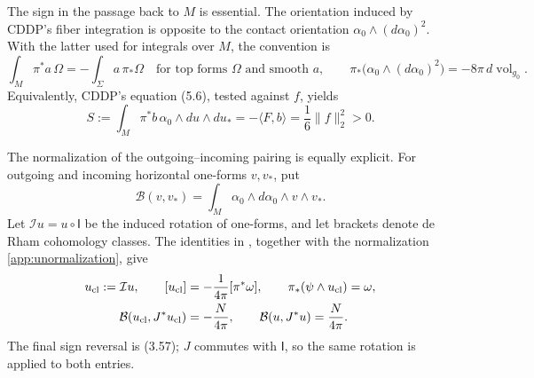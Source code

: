 \documentclass[11pt,letterpaper,reqno]{amsart}
\theoremstyle{remark}
\begin{document}
The sign in the passage back to $M$ is essential. The orientation
induced by CDDP's fiber integration is opposite to the contact
orientation $\alpha_0\wedge(d\alpha_0)^2$. With the latter used for
integrals over $M$, the convention is
\begin{equation}\label{app:orientation}
 \int_M\pi^*a\,\Omega
 =-\int_\Sigma a\,\pi_*\Omega
 \quad\text{for top forms $\Omega$ and smooth $a$},
 \qquad
 \pi_*\big(\alpha_0\wedge(d\alpha_0)^2\big)
 =-8\pi\,d\operatorname{vol}_{g_0}.
\end{equation}
Equivalently, CDDP's equation (5.6), tested against $f$, yields
\begin{equation}\label{app:Spositive}
 S:=\int_M\pi^*b\,\alpha_0\wedge du\wedge du_*
   =-\langle F,b\rangle
   =\frac16\|f\|_2^2>0.
\end{equation}

The normalization of the outgoing--incoming pairing is equally
explicit. For outgoing and incoming horizontal one-forms $v,v_*$, put
\begin{equation}\label{app:Bpairing}
 \mathcal B(v,v_*)
 =\int_M\alpha_0\wedge d\alpha_0\wedge v\wedge v_*.
\end{equation}
Let $\mathcal Iu=u\circ\mathsf I$ be the induced rotation of one-forms,
and let brackets denote de Rham cohomology classes. The identities in
\cite[Lemma~3.5, (3.57), (3.67), and the calculation preceding (3.59)]{CDDP},
together with the normalization
\eqref{app:unormalization}, give
\begin{align}\label{app:Bnormalization}
 u_{\rm cl}:=\mathcal Iu,\qquad
 [u_{\rm cl}]&=-\frac{1}{4\pi}[\pi^*\omega],\qquad
 \pi_*(\psi\wedge u_{\rm cl})=\omega,\notag\\
 \mathcal B(u_{\rm cl},J^*u_{\rm cl})&=-\frac{N}{4\pi},\qquad
 \mathcal B(u,J^*u)=\frac{N}{4\pi}.
\end{align}
The final sign reversal is (3.57); $J$ commutes with $\mathsf I$, so the
same rotation is applied to both entries.
\end{document}
